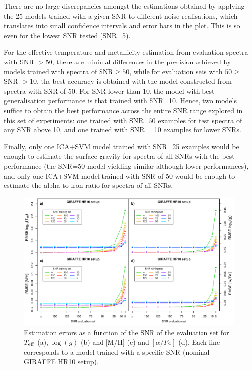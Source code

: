 \documentclass[a4paper,fleqn,usenatbib]{mnras}
\begin{document}
{{{There are no large discrepancies amongst the estimations
obtained by applying the 25 models trained with a given SNR to
different noise realisations, which translates into small confidence
intervals and error bars in the plot. This is so even for the lowest
SNR tested (SNR=5).

For the effective temperature and metallicity estimation from 
evaluation spectra with SNR $ > 50$, there are minimal
differences in the precision achieved by models trained with spectra
of SNR$\ge 50$, while for evaluation sets with $50 \ge$ SNR $> 10$, 
the best accuracy is obtained with the model constructed from spectra 
with SNR of 50. For SNR lower than 10, the model with best generalisation
performance is that trained with SNR=10. Hence, two models suffice to 
obtain the best performance across the entire SNR range explored in 
this set of experiments: one trained with SNR=50 examples for test 
spectra of any SNR above 10, and one trained with SNR = 10 examples 
for lower SNRs. 

Finally, only one ICA+SVM model trained with SNR=25 examples would be enough to
estimate the surface gravity for spectra of all SNRs with the best
performance (the SNR=50 model yielding similar although lower performances), 
and only one ICA+SVM model trained with SNR of 50 would be enough to
estimate the alpha to iron ratio for spectra of all SNRs.

\begin{figure}
\centering\includegraphics[width=\textwidth]{snr_errors_log_global_2x2.pdf}
\caption{Estimation errors as a function of the SNR of the evaluation
  set for $T_{\rm eff}$ (a), $\log(g)$ (b) and [M/H] (c) and
  $\left[ \alpha/Fe \right]$ (d). Each line corresponds to a model 
  trained with a specific SNR (nominal GIRAFFE HR10 setup).}
\label{fig:snrtrain}
\end{figure}

}}}
\end{document}
